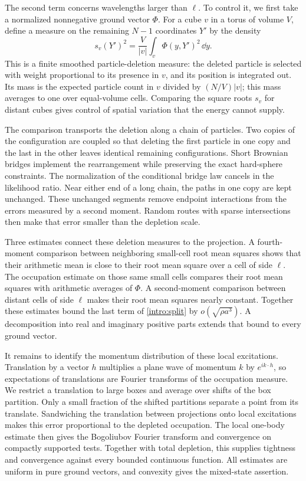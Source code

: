 The second term concerns wavelengths larger than $\ell$. To control it,
we first take a normalized nonnegative ground vector $\Phi$. For a cube $v$ in a
torus of volume $V$, define a measure on the remaining $N-1$ coordinates
$Y'$ by the density
\begin{equation}\label{intro:palm}
 s_v(Y')^2=\frac{V}{|v|}\int_v\Phi(y,Y')^2\,\dd y.
\end{equation}
This is a finite smoothed particle-deletion measure: the deleted
particle is selected with weight proportional to its presence in $v$,
and its position is integrated out. Its mass is the expected particle
count in $v$ divided by $(N/V)|v|$; this mass averages to one over
equal-volume cells.
Comparing the square roots $s_v$ for distant
cubes gives control of spatial variation that the energy cannot supply.

The comparison transports the deletion along a chain of particles.
Two copies of the configuration are coupled so that deleting the first
particle in one copy and the last in the other leaves identical remaining
configurations.
Short Brownian bridges implement the rearrangement while preserving
the exact hard-sphere constraints. The normalization of the conditional
bridge law cancels in the likelihood ratio. Near either end of a long
chain, the paths in one copy are kept unchanged. These unchanged segments
remove endpoint interactions from the errors measured by a second moment.
Random routes with sparse intersections then make that error smaller
than the depletion scale.

Three estimates connect these deletion measures to the projection.
A fourth-moment comparison between neighboring small-cell root mean
squares shows that their arithmetic mean is close to their root mean
square over a cell of side $\ell$.
The occupation estimate on those same small cells compares their root
mean squares with arithmetic averages of $\Phi$. A second-moment
comparison between distant cells of side $\ell$ makes their root mean
squares nearly constant. Together these estimates bound the last term
of \eqref{intro:split} by
$o(\sqrt{\rho a^3})$. A decomposition into real and imaginary positive
parts extends that bound to every ground vector.

It remains to identify the momentum distribution of these local
excitations. Translation by a vector $h$ multiplies a plane wave of
momentum $k$ by $e^{ik\cdot h}$, so expectations of translations are
Fourier transforms of the occupation measure. We restrict a translation
to large boxes and average over shifts of the box partition. Only a small
fraction of the shifted partitions separate a point from its translate.
Sandwiching the translation between projections onto local excitations
makes this error proportional to the depleted occupation. The local
one-body estimate then gives the Bogoliubov Fourier transform and
convergence on compactly supported tests. Together with total depletion,
this supplies tightness and convergence against every bounded continuous
function. All estimates are
uniform in pure ground vectors, and convexity gives the mixed-state
assertion.

